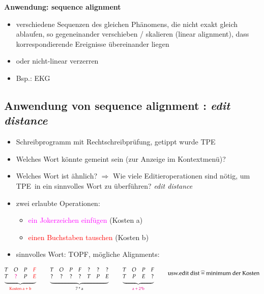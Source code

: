     \textbf{Anwendung: sequence alignment}
    \begin{itemize}
        \item verschiedene Sequenzen des gleichen Phänomens, die nicht exakt gleich ablaufen, so gegeneinander verschieben / skalieren (linear alignment), dass korrespondierende Ereignisse übereinander liegen
        \item oder nicht-linear verzerren
        \item Bsp.: EKG
    \end{itemize}

    \subsection*{Anwendung von sequence alignment : \emph{edit distance}}
    \begin{itemize}
        \item Schreibprogramm mit Rechtschreibprüfung, getippt wurde \glqq TPE\grqq
        \item Welches Wort könnte gemeint sein (zur Anzeige im Kontextmenü)?
        \item Welches Wort ist ähnlich? $\Rightarrow$ Wie viele Editieroperationen sind nötig, um \glqq TPE\grqq \ in ein sinnvolles Wort zu überführen? \emph{edit distance}
        \item zwei erlaubte Operationen:
        \begin{itemize}
            \item \textcolor{magenta}{ein Jokerzeichen einfügen} (Kosten a)
            \item \textcolor{red}{einen Buchstaben tauschen} (Kosten b)
        \end{itemize}
        \item sinnvolles Wort: \glqq TOPF\grqq , mögliche Alignments:
    \end{itemize}
    \[ \underbrace{\begin{matrix}
    T & O & P & \textcolor{red}{F} \\
    T & \textcolor{magenta}{?} & P & \textcolor{red}{E}
    \end{matrix}}_{\text{\textcolor{red}{Kosten a + b}}}\hspace*{0.8cm}  \underbrace{\begin{matrix} T & O & P & F & ? & ? & ? \\ ? & ? & ? & ? & T & P & E \end{matrix}}_{\text{7 * a}} \hspace*{0.8cm} \underbrace{\begin{matrix} T & O & P & F \\ T & P & E & ? \end{matrix}}_{\text{\textcolor{magenta}{a + 2*b}}} \hspace*{0.8cm} \text{usw.\\ edit dist } \widehat{=} \text{ minimum der Kosten}\]

